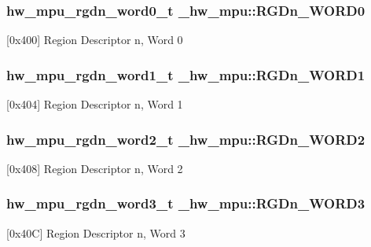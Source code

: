 \subsubsection[{\texorpdfstring{R\+G\+Dn\+\_\+\+W\+O\+R\+D0}{RGDn_WORD0}}]{ {\bf hw\+\_\+mpu\+\_\+rgdn\+\_\+word0\+\_\+t} \+\_\+hw\+\_\+mpu\+::\+R\+G\+Dn\+\_\+\+W\+O\+R\+D0}\hypertarget{struct__hw__mpu_a96f0637c49cc1d527b20c5df9e7e5ddc}{}\label{struct__hw__mpu_a96f0637c49cc1d527b20c5df9e7e5ddc}
\mbox{[}0x400\mbox{]} Region Descriptor n, Word 0 
\subsubsection[{\texorpdfstring{R\+G\+Dn\+\_\+\+W\+O\+R\+D1}{RGDn_WORD1}}]{ {\bf hw\+\_\+mpu\+\_\+rgdn\+\_\+word1\+\_\+t} \+\_\+hw\+\_\+mpu\+::\+R\+G\+Dn\+\_\+\+W\+O\+R\+D1}\hypertarget{struct__hw__mpu_ac8a281f61add48f8d9a2fd1f4ecd9b30}{}\label{struct__hw__mpu_ac8a281f61add48f8d9a2fd1f4ecd9b30}
\mbox{[}0x404\mbox{]} Region Descriptor n, Word 1 
\subsubsection[{\texorpdfstring{R\+G\+Dn\+\_\+\+W\+O\+R\+D2}{RGDn_WORD2}}]{ {\bf hw\+\_\+mpu\+\_\+rgdn\+\_\+word2\+\_\+t} \+\_\+hw\+\_\+mpu\+::\+R\+G\+Dn\+\_\+\+W\+O\+R\+D2}\hypertarget{struct__hw__mpu_aaa2c4a17d80d517dec17fc3170859384}{}\label{struct__hw__mpu_aaa2c4a17d80d517dec17fc3170859384}
\mbox{[}0x408\mbox{]} Region Descriptor n, Word 2 
\subsubsection[{\texorpdfstring{R\+G\+Dn\+\_\+\+W\+O\+R\+D3}{RGDn_WORD3}}]{ {\bf hw\+\_\+mpu\+\_\+rgdn\+\_\+word3\+\_\+t} \+\_\+hw\+\_\+mpu\+::\+R\+G\+Dn\+\_\+\+W\+O\+R\+D3}\hypertarget{struct__hw__mpu_a49a820a8d0997b275056ced0bfc1843e}{}\label{struct__hw__mpu_a49a820a8d0997b275056ced0bfc1843e}
\mbox{[}0x40C\mbox{]} Region Descriptor n, Word 3 

